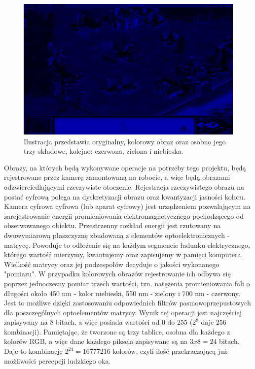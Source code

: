 \begin{figure}[H]
\begin{center}
\includegraphics[scale=0.2]{imgs/blue.jpg}
\caption[Rozbicie obrazu kolorowego na RGB.]{\small{Ilustracja przedstawia oryginalny, kolorowy obraz oraz osobno jego trzy składowe, kolejno: czerwona, zielona i niebieska.}\footnotemark}
\label{rgb}
\end{center}
\end{figure}

Obrazy, na których będą wykonywane operacje na potrzeby tego projektu, będą rejestrowane przez kamerę zamontowaną na robocie, a więc będą obrazami odzwierciedlającymi rzeczywiste otoczenie. Rejestracja rzeczywistego obrazu na postać cyfrową polega na dyskretyzacji obrazu oraz kwantyzacji jasności koloru\cite{Malina}. Kamera cyfrowa cyfrowa (lub aparat cyfrowy) jest urządzeniem pozwalającym na zarejestrowanie energii promieniowania elektromagnetycznego pochodzącego od obserwowanego obiektu. Przestrzenny rozkład energii jest rzutowany na dwuwymiarową płaszczyznę zbudowaną z elementów optoelektronicznych - matrycę. Powoduje to odłożenie się na każdym segmencie ładunku elektrycznego, którego wartość mierzymy, kwantujemy oraz zapisujemy w pamięci komputera. Wielkość matrycy oraz jej podzespołów decyduje o jakości wykonanego "pomiaru". W przypadku kolorowych obrazów rejestrowanie ich odbywa się poprzez jednoczesny pomiar trzech wartości, tzn. natężenia promieniowania fali o długości około 450 nm - kolor niebieski, 550 nm - zielony i 700 nm - czerwony. Jest to możliwe dzięki zastosowaniu odpowiednich filtrów pasmowoprzepustowych dla poszczególnych optoelementów matrycy.
Wynik tej operacji jest najczęściej zapisywany na 8 bitach, a więc posiada wartości od 0 do 255 ($2^8$ daje 256 kombinacji). Pamiętając, że tworzone są trzy tablice, osobna dla każdego z kolorów RGB, a więc dane każdego piksela zapisywane są na $3 x 8 = 24$ bitach. Daje to kombinację $2^{24} = 16777216$ kolorów, czyli ilość przekraczającą już możliwości percepcji ludzkiego oka.

